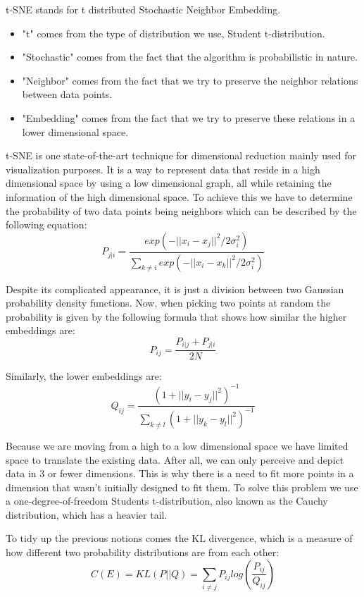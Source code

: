 t-SNE stands for t distributed Stochastic Neighbor Embedding. 
\begin{itemize}
    \item "t" comes from the type of distribution we use, Student t-distribution.
    \item "Stochastic" comes from the fact that the algorithm is probabilistic in nature.
    \item "Neighbor" comes from the fact that we try to preserve the neighbor relations between data points.
    \item "Embedding" comes from the fact that we try to preserve these relations in a lower dimensional space.
\end{itemize}
t-SNE is one state-of-the-art technique for dimensional reduction mainly used for visualization purposes. It is a 
way to represent data that reside in a high dimensional space by using a low dimensional graph, all while 
retaining the information of the high dimensional space. To achieve this we have to determine the probability
of two data points being neighbors which can be described by the following equation:
$$P_{j|i} = \frac{exp(-||x_i - x_j||^2 / 2\sigma_i^2)}{\sum_{k \neq i} exp(-||x_i - x_k||^2 / 2\sigma_i^2)}$$

Despite its complicated appearance, it is just a division between two Gaussian probability density functions.
Now, when picking two points at random the probability is given by the following formula that shows how similar
the higher embeddings are:
$$P_{ij} = \frac{P_{i|j} + P_{j|i}}{2N}$$

Similarly, the lower embeddings are: 
$$Q_{ij} = \frac{(1 + ||y_i - y_j||^2)^{-1}}{\sum_{k \neq l} (1 + ||y_k - y_l||^2)^{-1}}$$

Because we are moving from a high to a low dimensional space we have limited space to translate the existing
data. After all, we can only perceive and depict data in 3 or fewer dimensions. This is why there is a need to
fit more points in a dimension that wasn't initially designed to fit them. To solve this problem we use a 
one-degree-of-freedom Students t-distribution, also known as the Cauchy distribution, which has a heavier tail.

To tidy up the previous notions comes the KL divergence, which is a measure of how different two probability
distributions are from each other:
$$C(E) = KL(P||Q) = \sum_{i \neq j} P_{ij} log\left(\frac{P_{ij}}{Q_{ij}}\right)$$

